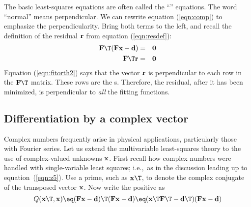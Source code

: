 \par
The basic least-squares equations are often called
the ``'' equations.
The word ``normal'' means perpendicular.
We can rewrite equation
(\ref{eqn:comp})
to emphasize the perpendicularity.
Bring both terms to the left,
and recall the definition of the residual $\bold r$
from equation (\ref{eqn:resdef}):
\begin{eqnarray}
\label{eqn:fitorth1}
\bold F\T ( \bold F   \bold x - \dd)  &=& \bold 0  \\
\bold F\T  \bold r                    &=& \bold 0 
\label{eqn:fitorth2}
\end{eqnarray}
Equation (\ref{eqn:fitorth2}) says that the  vector $\bold r$
is perpendicular to
each row in the $\bold F\T$ matrix.
These rows are the s.
Therefore, the residual, after it has been minimized,
is perpendicular to
{\it all}
the fitting functions.

\subsection{Differentiation by a complex vector}

\par
Complex numbers frequently arise in physical applications,
particularly those with Fourier series.
Let us extend the multivariable least-squares theory
to the use of complex-valued unknowns $\bold x$.
First recall how complex numbers were handled
with single-variable least squares;
i.e.,~as in the discussion leading up to equation~(\ref{eqn:z5}).
Use a prime, such as $\bold x\T$, to denote the complex conjugate
of the transposed vector $\bold x$.
Now write the positive  as
\begin{equation}
Q(\bold x\T, \bold x) \eq
(\bold F\bold x - \bold d)\T
(\bold F\bold x - \bold d)
\eq
(\bold x\T \bold F\T - \bold d\T)
(\bold F\bold x - \bold d)
\label{eqn:6-1-23}
\end{equation}

